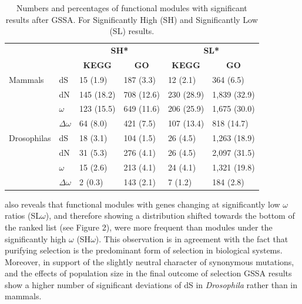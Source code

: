 \begin{table}[htbp]
\begin{center}
\begin{tabular}{ l l l l l l }
\hline
 &  & \multicolumn{ 2}{c}{\textbf{SH*}} & \multicolumn{ 2}{c}{\textbf{SL*}} \\  \cline{ 3- 4} \cline{4-6}
 &  & \multicolumn{1}{c}{\textbf{KEGG }} & \multicolumn{1}{c}{\textbf{GO }} & \multicolumn{1}{c}{\textbf{KEGG }} & \multicolumn{1}{c}{\textbf{GO}} \\ \hline
\multicolumn{ 1}{l}{Mammals} &  dS  &  15 (1.9)    &  187 (3.3)   &  12 (2.1)    &  364 (6.5) \\
\multicolumn{ 1}{l}{} &  dN  &  145 (18.2)  &  708 (12.6)  &  230 (28.9)  &  1,839 (32.9) \\
\multicolumn{ 1}{l}{} & $\omega$ &  123 (15.5)  &  649 (11.6)  &  206 (25.9)  &  1,675 (30.0) \\
\multicolumn{ 1}{l}{} & $\Delta\omega$ &  64 (8.0)    &  421 (7.5)   &  107 (13.4)  &  818 (14.7) \\ \hline
\multicolumn{ 1}{l}{Drosophilas} &  dS  &  18 (3.1)    &  104 (1.5)   &  26 (4.5)    &  1,263 (18.9) \\
\multicolumn{ 1}{l}{} &  dN  &  31 (5.3)    &  276 (4.1)   &  26 (4.5)    &  2,097 (31.5) \\
\multicolumn{ 1}{l}{} & $\omega$ &  15 (2.6)    &  213 (4.1)   &  24 (4.1)    &  1,321 (19.8) \\
\multicolumn{ 1}{l}{} & $\Delta\omega$ &  2 (0.3)     &  143 (2.1)   &  7 (1.2)     &  184 (2.8) \\ \hline
\end{tabular}
\end{center}
\caption[Numbers and percentages of functional modules with significant results after GSSA.]{Numbers and percentages of functional modules with significant results after GSSA. For Significantly High (SH) and Significantly Low (SL) results.}
\label{tab:gssanum_perc}
\end{table}

 also reveals that functional modules with genes changing at significantly low $\omega$ ratios (SL$\omega$), and therefore showing a distribution shifted towards the bottom of the ranked list (see Figure 2), were more frequent than modules under the significantly high $\omega$ (SH$\omega$). This observation is in agreement with the fact that purifying selection is the predominant form of selection in biological systems. Moreover, in support of the slightly neutral character of synonymous mutations, and the effects of population size in the final outcome of selection \cite{Lynch2007} GSSA results show a higher number of significant deviations of dS in \textit{Drosophila} rather than in mammals.

